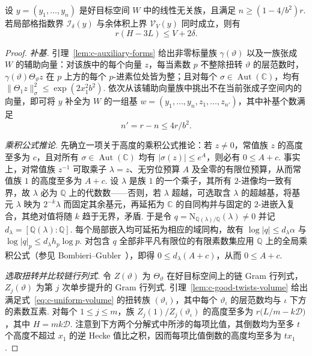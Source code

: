\begin{theorem}[C：计入局部格指数损失的提升余体积下界]
\label{thm:long-forms}
\emitthmsource
设 $y=(y_1,\dots,y_n)$ 是好目标空间 $W$ 中的线性无关族，且满足 $n\ge(1-4/b^2)r$. 若局部格指数界 $\mathcal I_\delta(y)$ 与余体积上界 $\mathcal V_V(y)$ 同时成立，则有
\begin{equation}
  r(H-3L)\le V+2\delta.
\label{eq:c-long-forms}
\end{equation}
\end{theorem}
\begin{proof}
\emph{补基.}
引理~\ref{lem:c-auxiliary-forms} 给出非零标量族 $\gamma(\vartheta)$ 以及一族张成 $W$ 的辅助向量：对该族中的每个向量 $z$，每当素数 $p$ 不整除扭转 $\vartheta$ 的层范数时，$\gamma(\vartheta)\Theta_\vartheta z$ 在 $p$ 上方的每个 $p$-进素位处皆为整；且对每个 $\sigma\in\operatorname{Aut}(\mathbb C)$，均有 $\|\Theta_1 z\|_\sigma^2\le \exp(2x_1^2b^2)$. 依次从该辅助向量族中挑出不在当前张成子空间内的向量，即可将 $y$ 补全为 $W$ 的一组基 $w=(y_1,\dots,y_n,z_1,\dots,z_{n'})$，其中补基个数满足
\[
 n'=r-n\le 4r/b^2.
\]

\emph{乘积公式推论.}
先确立一项关于高度的乘积公式推论：若 $z\ne0$，常值族 $z$ 的高度至多为 $c$，且对所有 $\sigma\in\operatorname{Aut}(\mathbb C)$ 均有 $|\sigma(z)|\le e^A$，则必有 $0\le A+c$. 事实上，对常值族 $z^{-1}$ 可取乘子 $\lambda=z$、无穷位预算 $A$ 及全零的有限位预算，从而常值族 $1$ 的高度至多为 $A+c$. 设 $\lambda$ 是族 $1$ 的一个乘子，其所有 $2$-进像均一致有界，故 $\lambda$ 必为 $\mathbb Q$ 上的代数数——否则，若 $\lambda$ 超越，可选取含 $\lambda$ 的超越基，将基元 $\lambda$ 映为 $2^{-k}\lambda$ 而固定其余基元，再延拓为 $\mathbb C$ 的自同构并与固定的 $2$-进嵌入复合，其绝对值将随 $k$ 趋于无界，矛盾. 于是令 $q=\mathrm N_{\mathbb Q(\lambda)/\mathbb Q}(\lambda)\ne0$ 并记 $d_\lambda=[\mathbb Q(\lambda):\mathbb Q]$. 每个局部嵌入均可延拓为相应的域同构，故有 $\log |q|\le d_\lambda\alpha$ 与 $\log |q|_p\le d_\lambda h_p\log p$. 对包含 $q$ 全部非平凡有限位的有限素数集应用 $\mathbb Q$ 上的全局乘积公式（参见 Bombieri--Gubler~\cite{BombieriGubler2006}），即得 $0\le d_\lambda(A+c)$，从而 $0\le A+c$.

\emph{选取扭转并比较链行列式.}
令 $Z(\vartheta)$ 为 $\Theta_\vartheta$ 在好目标空间上的链 Gram 行列式，$Z_j(\vartheta)$ 为第 $j$ 次单步提升的 Gram 行列式. 引理~\ref{lem:c-good-twists-volume} 给出满足式~\eqref{eq:c-uniform-volume} 的扭转族 $(\vartheta_\iota)$，其中每个 $\vartheta_\iota$ 的层范数均与 $\iota$ 下方的素数互素. 对每个 $1\le j\le m$，族 $Z_j(1)/Z_j(\vartheta_\iota)$ 的高度至多为 $r\bigl(L/m-k\mathcal D\bigr)$，其中 $H=mk\mathcal D$. 注意到下方两个分解式中所涉的每项比值，其倒数均为至多 $t$ 个高度不超过 $x_1$ 的逆 Hecke 值比之积，因而每项比值倒数的高度均至多为 $tx_1$.


\end{proof}
